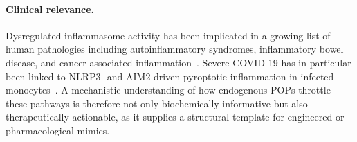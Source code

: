 \paragraph{Clinical relevance.} Dysregulated inflammasome activity has been implicated in a growing list of human pathologies including autoinflammatory syndromes, inflammatory bowel disease, and cancer-associated inflammation~\cite{tartey2019inflammasomes,sharma2018pyrin}. Severe COVID-19 has in particular been linked to NLRP3- and AIM2-driven pyroptotic inflammation in infected monocytes~\cite{vora2021inflammasome,junqueira2022sarscov2}. A mechanistic understanding of how endogenous POPs throttle these pathways is therefore not only biochemically informative but also therapeutically actionable, as it supplies a structural template for engineered or pharmacological mimics.
